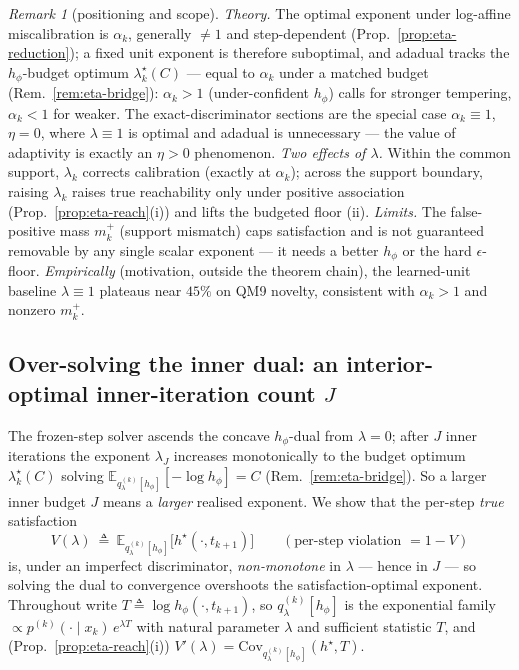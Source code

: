 \documentclass[11pt]{article}
\newcommand{\E}{\mathbb{E}}
\newcommand{\Cov}{\mathrm{Cov}}
\newcommand{\hs}{h^\star}
\theoremstyle{plain}
\theoremstyle{definition}
\theoremstyle{remark}
\newtheorem{remark}{Remark}
\begin{document}
\begin{remark}[positioning and scope]
\label{rem:eta-position}
\emph{Theory.} The optimal exponent under log-affine miscalibration is $\alpha_k$, generally
$\ne1$ and step-dependent (Prop.~\ref{prop:eta-reduction}); a fixed unit exponent is therefore
suboptimal, and adadual tracks the $h_\phi$-budget optimum $\lambda^\star_k(C)$ --- equal to
$\alpha_k$ under a matched budget (Rem.~\ref{rem:eta-bridge}): $\alpha_k>1$ (under-confident
$h_\phi$) calls for stronger tempering, $\alpha_k<1$ for weaker. The
exact-discriminator sections are the special case $\alpha_k\equiv1$, $\eta=0$, where $\lambda\equiv1$
is optimal and adadual is unnecessary --- the value of adaptivity is exactly an $\eta>0$
phenomenon. \emph{Two effects of $\lambda$.} Within the common support, $\lambda_k$ corrects
calibration (exactly at $\alpha_k$); across the support boundary, raising $\lambda_k$ raises true
reachability only under positive association (Prop.~\ref{prop:eta-reach}(i)) and lifts the
budgeted floor (ii). \emph{Limits.} The false-positive mass $m^+_k$ (support mismatch) caps
satisfaction and is not guaranteed removable by any single scalar exponent --- it needs a better
$h_\phi$ or the hard $\epsilon$-floor. \emph{Empirically} (motivation, outside the theorem chain),
the learned-unit baseline $\lambda\equiv1$ plateaus near $45\%$ on QM9 novelty, consistent with
$\alpha_k>1$ and nonzero $m^+_k$.
\end{remark}

\subsection{Over-solving the inner dual: an interior-optimal inner-iteration count $J$}
\label{sec:eta-oversolve}

The frozen-step solver ascends the concave $h_\phi$-dual from $\lambda=0$; after $J$ inner
iterations the exponent $\lambda_J$ increases monotonically to the budget optimum
$\lambda^\star_k(C)$ solving $\E_{q^{(k)}_\lambda[h_\phi]}[-\log h_\phi]=C$
(Rem.~\ref{rem:eta-bridge}). So a larger inner budget $J$ means a \emph{larger} realised
exponent. We show that the per-step \emph{true} satisfaction
\begin{equation}
\label{eq:Vdef}
V(\lambda)\ \triangleq\ \E_{q^{(k)}_\lambda[h_\phi]}\!\big[\hs(\cdot,t_{k+1})\big]
\qquad(\text{per-step violation }=1-V)
\end{equation}
is, under an imperfect discriminator, \emph{non-monotone} in $\lambda$ --- hence in $J$ ---
so solving the dual to convergence overshoots the satisfaction-optimal exponent. Throughout
write $T\triangleq\log h_\phi(\cdot,t_{k+1})$, so $q^{(k)}_\lambda[h_\phi]$ is the exponential
family $\propto p^{(k)}(\cdot\mid x_k)\,e^{\lambda T}$ with natural parameter $\lambda$ and
sufficient statistic $T$, and (Prop.~\ref{prop:eta-reach}(i)) $V'(\lambda)=\Cov_{q^{(k)}_\lambda[h_\phi]}(\hs,T)$.
\end{document}
